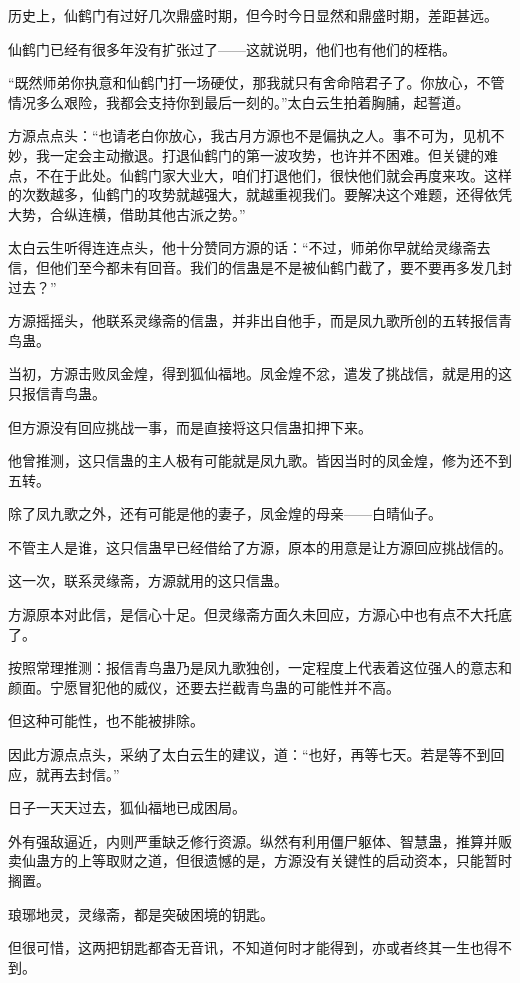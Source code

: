 \begin{this_body}
历史上，仙鹤门有过好几次鼎盛时期，但今时今日显然和鼎盛时期，差距甚远。

仙鹤门已经有很多年没有扩张过了——这就说明，他们也有他们的桎梏。

“既然师弟你执意和仙鹤门打一场硬仗，那我就只有舍命陪君子了。你放心，不管情况多么艰险，我都会支持你到最后一刻的。”太白云生拍着胸脯，起誓道。

方源点点头：“也请老白你放心，我古月方源也不是偏执之人。事不可为，见机不妙，我一定会主动撤退。打退仙鹤门的第一波攻势，也许并不困难。但关键的难点，不在于此处。仙鹤门家大业大，咱们打退他们，很快他们就会再度来攻。这样的次数越多，仙鹤门的攻势就越强大，就越重视我们。要解决这个难题，还得依凭大势，合纵连横，借助其他古派之势。”

太白云生听得连连点头，他十分赞同方源的话：“不过，师弟你早就给灵缘斋去信，但他们至今都未有回音。我们的信蛊是不是被仙鹤门截了，要不要再多发几封过去？”

方源摇摇头，他联系灵缘斋的信蛊，并非出自他手，而是凤九歌所创的五转报信青鸟蛊。

当初，方源击败凤金煌，得到狐仙福地。凤金煌不忿，遣发了挑战信，就是用的这只报信青鸟蛊。

但方源没有回应挑战一事，而是直接将这只信蛊扣押下来。

他曾推测，这只信蛊的主人极有可能就是凤九歌。皆因当时的凤金煌，修为还不到五转。

除了凤九歌之外，还有可能是他的妻子，凤金煌的母亲——白晴仙子。

不管主人是谁，这只信蛊早已经借给了方源，原本的用意是让方源回应挑战信的。

这一次，联系灵缘斋，方源就用的这只信蛊。

方源原本对此信，是信心十足。但灵缘斋方面久未回应，方源心中也有点不大托底了。

按照常理推测：报信青鸟蛊乃是凤九歌独创，一定程度上代表着这位强人的意志和颜面。宁愿冒犯他的威仪，还要去拦截青鸟蛊的可能性并不高。

但这种可能性，也不能被排除。

因此方源点点头，采纳了太白云生的建议，道：“也好，再等七天。若是等不到回应，就再去封信。”

日子一天天过去，狐仙福地已成困局。

外有强敌逼近，内则严重缺乏修行资源。纵然有利用僵尸躯体、智慧蛊，推算并贩卖仙蛊方的上等取财之道，但很遗憾的是，方源没有关键性的启动资本，只能暂时搁置。

琅琊地灵，灵缘斋，都是突破困境的钥匙。

但很可惜，这两把钥匙都杳无音讯，不知道何时才能得到，亦或者终其一生也得不到。


\end{this_body}
